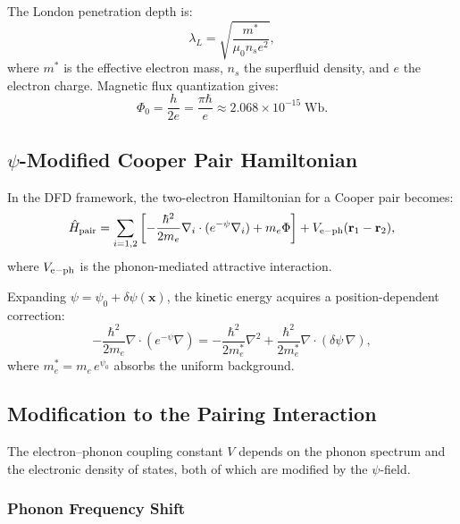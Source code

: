\documentclass[aps,prb,twocolumn,superscriptaddress,floatfix,nofootinbib,longbibliography]{revtex4-2}
\newcommand{\Phipot}{\Phi}
\begin{document}
The London penetration depth is:
\begin{equation}
\lambda_L = \sqrt{\frac{m^*}{\mu_0 n_s e^2}},
\label{eq:london}
\end{equation}
where $m^*$ is the effective electron mass, $n_s$ the superfluid density,
and $e$ the electron charge.  Magnetic flux quantization gives:
\begin{equation}
\Phi_0 = \frac{h}{2e} = \frac{\pi\hbar}{e} \approx 2.068 \times 10^{-15}\;\text{Wb}.
\label{eq:flux-quantum}
\end{equation}

\subsection{$\psi$-Modified Cooper Pair Hamiltonian}

In the DFD framework, the two-electron Hamiltonian for a Cooper pair
becomes:
\begin{equation}
\hat{H}_{\rm pair} = \sum_{i=1,2}\left[
-\frac{\hbar^2}{2m_e}\nabla_i\cdot(e^{-\psi}\nabla_i)
+ m_e\Phipot
\right] + V_{\rm e-ph}(\mathbf{r}_1 - \mathbf{r}_2),
\label{eq:pair-H}
\end{equation}
where $V_{\rm e-ph}$ is the phonon-mediated attractive interaction.

Expanding $\psi = \psi_0 + \delta\psi(\mathbf{x})$, the kinetic energy
acquires a position-dependent correction:
\begin{equation}
-\frac{\hbar^2}{2m_e}\nabla\cdot(e^{-\psi}\nabla) =
-\frac{\hbar^2}{2m_e^*}\nabla^2
+ \frac{\hbar^2}{2m_e^*}\nabla\cdot(\delta\psi\,\nabla),
\label{eq:kinetic-expand}
\end{equation}
where $m_e^* = m_e\,e^{\psi_0}$ absorbs the uniform background.

\subsection{Modification to the Pairing Interaction}

The electron--phonon coupling constant $V$ depends on the phonon spectrum
and the electronic density of states, both of which are modified by the
$\psi$-field.

\subsubsection{Phonon Frequency Shift}
\end{document}
